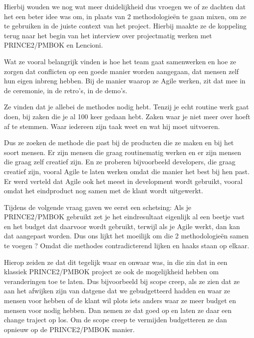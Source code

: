 \documentclass[dutch]{hogent-article}
\begin{document}
Hierbij wouden we nog wat meer duidelijkheid dus vroegen we of ze dachten dat het een beter idee was om, in plaats van 2 methodologieën te gaan mixen, om ze te gebruiken in de juiste context van het project. Hierbij maakte ze de koppeling terug naar het begin van het interview over projectmatig werken met PRINCE2/PMBOK en Lencioni. 
\newline

Wat ze vooral belangrijk vinden is hoe het team gaat samenwerken en hoe ze zorgen dat conflicten op een goede manier worden aangegaan, dat mensen zelf hun eigen inbreng hebben. Bij de manier waarop ze Agile werken, zit dat mee in de ceremonie, in de retro’s, in de demo’s. 
\newline

Ze vinden dat je allebei de methodes nodig hebt. Tenzij je echt routine werk gaat doen, bij zaken die je al 100 keer gedaan hebt. Zaken waar je niet meer over hoeft af te stemmen. Waar iedereen zijn taak weet en wat hij moet uitvoeren.
\newline

Dus ze zoeken de methode die past bij de producten die ze maken en bij het soort mensen. Er zijn mensen die graag routinematig werken en er zijn mensen die graag zelf creatief zijn. En ze proberen bijvoorbeeld developers, die graag creatief zijn, vooral Agile te laten werken omdat die manier het best bij hen past. Er werd verteld dat Agile ook het meest in development wordt gebruikt, vooral omdat het eindproduct nog samen met de klant wordt uitgewerkt. 
\newline

Tijdens de volgende vraag gaven we eerst een schetsing: Als je PRINCE2/PMBOK gebruikt zet je het eindresultaat eigenlijk al een beetje vast en het budget dat daarvoor wordt gebruikt, terwijl als je Agile werkt, dan kan dat aangepast worden. Dus ons lijkt het moeilijk om die 2 methodologieën samen te voegen ? Omdat die methodes contradicterend lijken en haaks staan op elkaar.
\newline

Hierop zeiden ze dat dit tegelijk waar en onwaar was, in die zin dat in een klassiek PRINCE2/PMBOK project ze ook de mogelijkheid hebben om veranderingen toe te laten. Dus bijvoorbeeld bij scope creep, als ze zien dat ze aan het afwijken zijn van datgene dat we gebudgetteerd hadden en waar ze mensen voor hebben of de klant wil plots iets anders waar ze meer budget en mensen voor nodig hebben. Dan nemen ze dat goed op en  laten ze daar een change traject op los. Om de scope creep te vermijden budgetteren ze dan opnieuw op de PRINCE2/PMBOK manier. 
\newline
\end{document}
